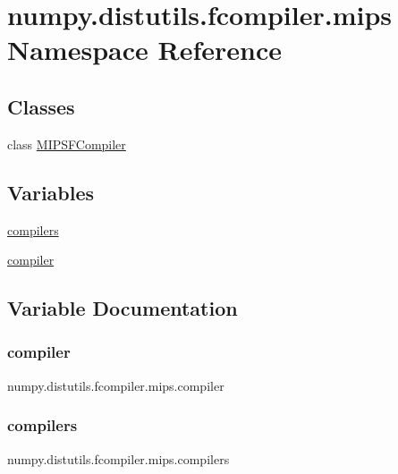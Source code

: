 \hypertarget{namespacenumpy_1_1distutils_1_1fcompiler_1_1mips}{}\section{numpy.\+distutils.\+fcompiler.\+mips Namespace Reference}
\label{namespacenumpy_1_1distutils_1_1fcompiler_1_1mips}
\subsection*{Classes}
\begin{DoxyCompactItemize}
\item 
class \hyperlink{classnumpy_1_1distutils_1_1fcompiler_1_1mips_1_1MIPSFCompiler}{M\+I\+P\+S\+F\+Compiler}
\end{DoxyCompactItemize}
\subsection*{Variables}
\begin{DoxyCompactItemize}
\item 
\hyperlink{namespacenumpy_1_1distutils_1_1fcompiler_1_1mips_aa3652835cb1439a08c8c54c875a2740d}{compilers}
\item 
\hyperlink{namespacenumpy_1_1distutils_1_1fcompiler_1_1mips_a5eb0b80b179350b06bf44fe2bcc4f923}{compiler}
\end{DoxyCompactItemize}


\subsection{Variable Documentation}
\mbox{\label{namespacenumpy_1_1distutils_1_1fcompiler_1_1mips_a5eb0b80b179350b06bf44fe2bcc4f923}} 
\subsubsection{\texorpdfstring{compiler}{compiler}}
{\footnotesize\ttfamily numpy.\+distutils.\+fcompiler.\+mips.\+compiler}

\mbox{\label{namespacenumpy_1_1distutils_1_1fcompiler_1_1mips_aa3652835cb1439a08c8c54c875a2740d}} 
\subsubsection{\texorpdfstring{compilers}{compilers}}
{\footnotesize\ttfamily numpy.\+distutils.\+fcompiler.\+mips.\+compilers}


